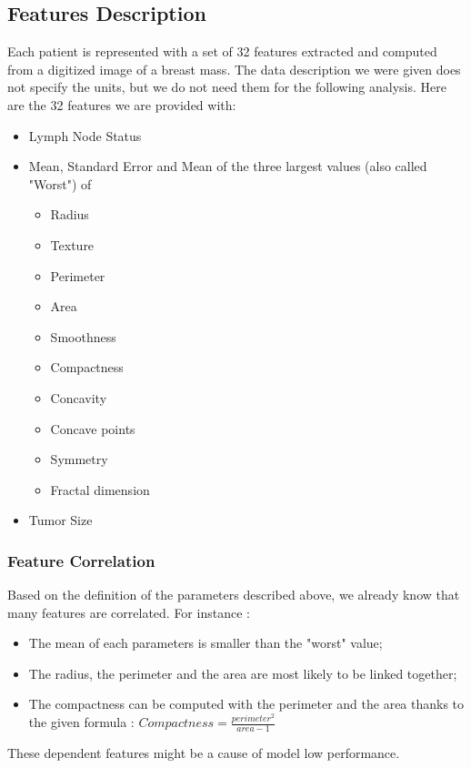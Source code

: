 \documentclass[]{report}
\begin{document}
\subsection{Features Description}
Each patient is represented with a set of 32 features extracted and computed from a digitized image of a breast mass. The data description we were given does not specify the units, but we do not need them for the following analysis. Here are the 32 features we are provided with:  
\begin{itemize}
	\item Lymph Node Status
	
	\item Mean, Standard Error and Mean of the three largest values (also called "Worst") of 
		\begin{itemize}
			\item Radius
			\item Texture
			\item Perimeter
			\item Area
			\item Smoothness
			\item Compactness
			\item Concavity
			\item Concave points
			\item Symmetry
			\item Fractal dimension
		\end{itemize}
	
	\item Tumor Size
\end{itemize}

\subsubsection{Feature Correlation}
Based on the definition of the parameters described above, we already know that many features are correlated. For instance : 
\begin{itemize}
	\item The mean of each parameters is smaller than the "worst" value;
	\item The radius, the perimeter and the area are most likely to be linked together;
	\item The compactness can be computed with the perimeter and the area thanks to the given formula : $Compactness = \frac{perimeter^2}{area - 1}$
\end{itemize}

These dependent features might be a cause of model low performance.
\end{document}
